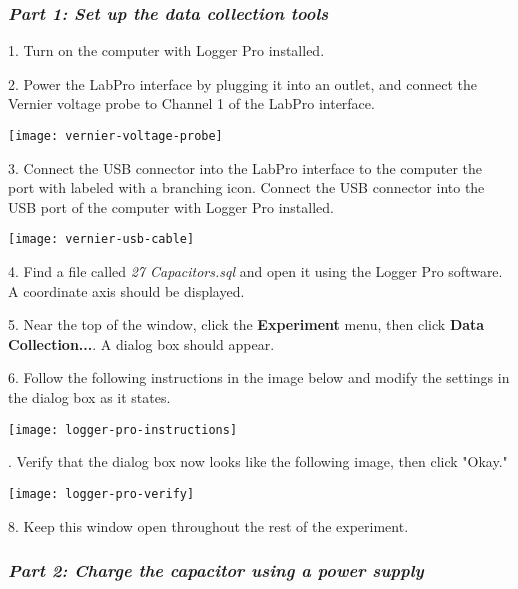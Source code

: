 \documentclass[12pt]{article}
\begin{document}
\subsubsection*{\emph{Part 1: Set up the data collection tools}}


1. Turn on the computer with Logger Pro installed.

2. Power the LabPro interface by plugging it into an outlet, and connect the Vernier voltage probe to Channel 1 of the LabPro interface.

\begin{center} \texttt{[image: vernier-voltage-probe]} \\ \footnotesize \end{center}


3. Connect the USB connector into the LabPro interface to the computer the port with labeled with a branching icon. Connect the USB connector into the USB port of the computer with Logger Pro installed. 
\begin{center} \texttt{[image: vernier-usb-cable]} \\ \footnotesize \end{center}


4. Find a file called \emph{27 Capacitors.sql} and open it using the Logger Pro software. A coordinate axis should be displayed.

5. Near the top of the window, click the \textbf{Experiment} menu, then click \textbf{Data Collection...}. A dialog box should appear.

6. Follow the following instructions in the image below and modify the settings in the dialog box as it states.

\begin{center} \texttt{[image: logger-pro-instructions]} \\ \footnotesize \end{center}
. Verify that the dialog box now looks like the following image, then click "Okay." 

\begin{center} \texttt{[image: logger-pro-verify]} \\ \footnotesize \end{center}

8. Keep this window open throughout the rest of the experiment.

\pagebreak
\subsubsection*{\emph{Part 2: Charge the capacitor using a power supply}}
\end{document}
